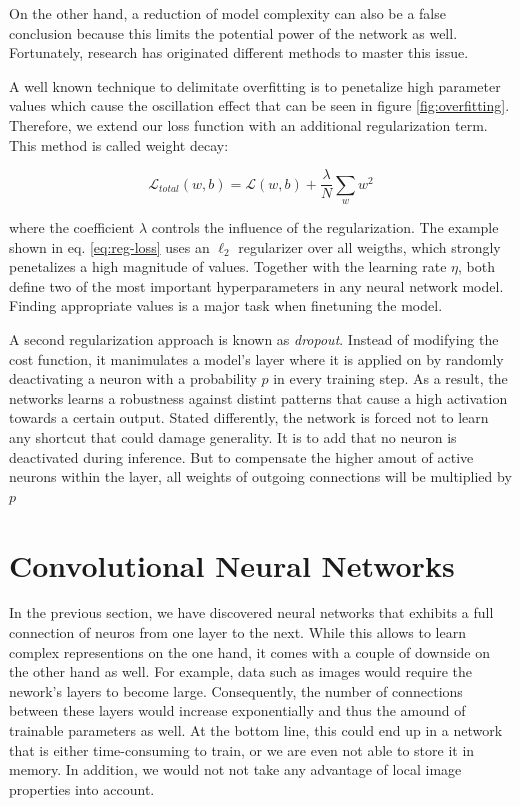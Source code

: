 On the other hand, a reduction of model complexity can also be a false conclusion because this limits the potential power of the network as well. Fortunately, research has originated different methods to master this issue.

A well known technique to delimitate overfitting is to penetalize high parameter values which cause the oscillation effect that can be seen in figure \ref{fig:overfitting}. Therefore, we extend our loss function with an additional regularization term. This method is called weight decay:

\begin{equation} \label{eq:reg-loss}
  \mathcal{L}_{total}(w, b)= \mathcal{L}(w, b) + \frac{\lambda}{N} \sum\limits_{w}w^2
\end{equation}

where the coefficient $ \lambda $ controls the influence of the regularization. The example shown in eq. \ref{eq:reg-loss} uses an $ \ell_{2} $ regularizer over all weigths, which strongly penetalizes a high magnitude of values. Together with the learning rate $ \eta $, both define two of the most important hyperparameters in any neural network model. Finding appropriate values is a major task when finetuning the model.

A second regularization approach is known as \textit{dropout}. Instead of modifying the cost function, it manimulates a model's layer where it is applied on by randomly deactivating a neuron with a probability $p$ in every training step. As a result, the networks learns a robustness against distint patterns that cause a high activation towards a certain output. Stated differently, the network is forced not to learn any shortcut that could damage generality. It is to add that no neuron is deactivated during inference. But to compensate the higher amout of active neurons within the layer, all weights of outgoing connections will be multiplied by $ p $ \parencite[p. 1931]{dropout}



\section{Convolutional Neural Networks}

In the previous section, we have discovered neural networks that exhibits a full connection of neuros from one layer to the next. While this allows to learn complex representions on the one hand, it comes with a couple of downside on the other hand as well. For example, data such as images would require the nework's layers to become large. Consequently, the number of connections between these layers would increase exponentially and thus the amound of trainable parameters as well. At the bottom line, this could end up in a network that is either time-consuming to train, or we are even not able to store it in memory. In addition, we would not not take any advantage of local image properties into account.

